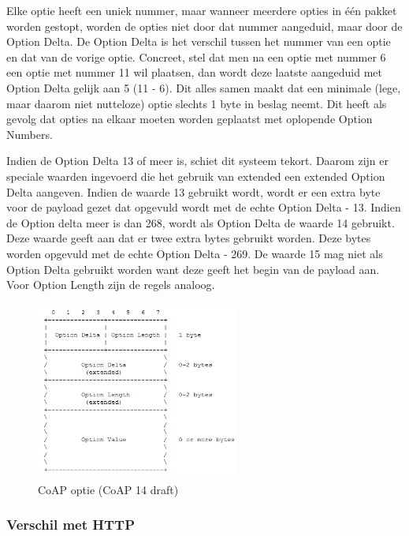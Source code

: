 Elke optie heeft een uniek nummer, maar wanneer meerdere opties in \'{e}\'{e}n pakket worden gestopt, worden de opties niet door dat nummer aangeduid, maar door de Option Delta. De Option Delta is het verschil tussen het nummer van een optie en dat van de vorige optie.
Concreet, stel dat men na een optie met nummer 6 een optie met nummer 11 wil plaatsen, dan wordt deze laatste aangeduid met Option Delta gelijk aan 5 (11 - 6). Dit alles samen maakt dat een minimale (lege, maar daarom niet nutteloze) optie slechts 1 byte in beslag neemt. Dit heeft als gevolg dat opties na elkaar moeten worden geplaatst met oplopende Option Numbers.

Indien de Option Delta 13 of meer is, schiet dit systeem tekort. Daarom zijn er speciale waarden ingevoerd die het gebruik van extended een extended Option Delta aangeven. Indien de waarde 13 gebruikt wordt, wordt er een extra byte voor de payload gezet dat opgevuld wordt met de echte Option Delta - 13. Indien de Option delta meer is dan 268, wordt als Option Delta de waarde 14 gebruikt. Deze waarde geeft aan dat er twee extra bytes gebruikt worden. Deze bytes worden opgevuld met de echte Option Delta - 269. De waarde 15 mag niet als Option Delta gebruikt worden want deze geeft het begin van de payload aan. Voor Option Length zijn de regels analoog.


\begin{figure}[h]
\centering
\includegraphics[width=0.6\textwidth]{fig/CoAPOpties}
\vspace{-10pt}
\caption{CoAP optie (CoAP 14 draft)}
\label{fig:CoAPOpties}
\end{figure}

\newpage

\subsubsection{Verschil met HTTP}

